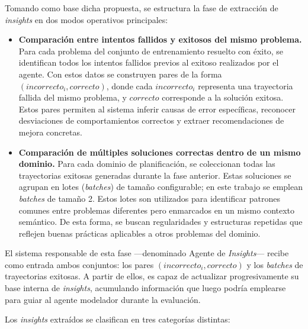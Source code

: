 Tomando como base dicha propuesta, se estructura la fase de extracción de \textit{insights} en dos modos operativos principales:

\begin{itemize}
  \item \textbf{Comparación entre intentos fallidos y exitosos del mismo problema.} Para cada problema del conjunto de entrenamiento resuelto con éxito, se identifican todos los intentos fallidos previos al exitoso realizados por el agente. Con estos datos se construyen pares de la forma $(\textit{incorrecto}_i, \textit{correcto})$, donde cada $\textit{incorrecto}_i$ representa una trayectoria fallida del mismo problema, y $\textit{correcto}$ corresponde a la solución exitosa. Estos pares permiten al sistema inferir causas de error específicas, reconocer desviaciones de comportamientos correctos y extraer recomendaciones de mejora concretas.
  
  \item \textbf{Comparación de múltiples soluciones correctas dentro de un mismo dominio.} Para cada dominio de planificación, se coleccionan todas las trayectorias exitosas generadas durante la fase anterior. Estas soluciones se agrupan en lotes (\textit{batches}) de tamaño configurable; en este trabajo se emplean \textit{batches} de tamaño 2. Estos lotes son utilizados para identificar patrones comunes entre problemas diferentes pero enmarcados en un mismo contexto semántico. De esta forma, se buscan regularidades y estructuras repetidas que reflejen buenas prácticas aplicables a otros problemas del dominio.
\end{itemize}

El sistema responsable de esta fase —denominado Agente de \textit{Insights}— recibe como entrada ambos conjuntos: los pares $(\textit{incorrecto}_i, \textit{correcto})$ y los \textit{batches} de trayectorias exitosas. A partir de ellos, es capaz de actualizar progresivamente su base interna de \textit{insights}, acumulando información que luego podría emplearse para guiar al agente modelador durante la evaluación.

Los \textit{insights} extraídos se clasifican en tres categorías distintas:

